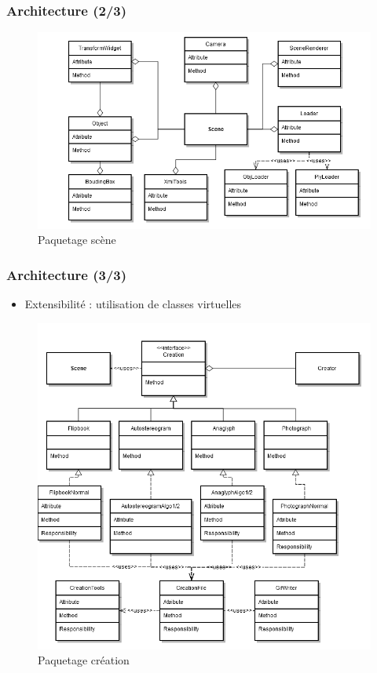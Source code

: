 \documentclass{beamer}
\begin{document}

\begin{frame}
\frametitle{Architecture (2/3)}
\centering
\begin{figure}
  \includegraphics[scale=0.4]{scene.png}
  \caption{Paquetage scène}
\end{figure}
\end{frame}

% 

\begin{frame}
\frametitle{Architecture (3/3)}
\begin{itemize}[label=$\bullet$]
\item Extensibilité : utilisation de classes virtuelles
\end{itemize}
\centering
\begin{figure}
  \includegraphics[scale=0.25]{extensibilite.png}
  \caption{Paquetage création}
\end{figure}
\end{frame}
\end{document}
